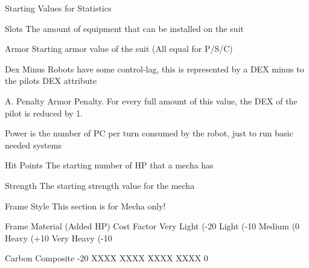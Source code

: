 \documentclass[twoside]{book}
\begin{document}
                    
                  Starting Values for Statistics  
                  
                  
                  
                     Slots 
                      The amount of equipment that can be installed
                     on the suit 
                    
                  
                     Armor 
                      Starting armor value of the suit (All equal
                     for P/S/C) 
                    
                  
                     Dex Minus 
                      Robots have some control-lag, this is
                     represented by a DEX minus to the pilots DEX
                     attribute 
                    
                  
                     A. Penalty 
                      Armor Penalty. For every full amount of this
                     value, the DEX of the pilot is reduced by 1. 
                    
                  
                     Power 
                      is the number of PC per turn consumed by the
                     robot, just to run basic needed systems 
                    
                  
                     Hit Points 
                      The starting number of HP that a mecha has
                     
                    
                  
                     Strength 
                      The starting strength value for the mecha
                     
                    
                  
                
                
                Frame Style  
                 This section is for Mecha only!   
                  
                    
                      
                       Frame Material (Added HP)   
                       Cost Factor   
                       Very Light (-20%
                       Light (-10%
                       Medium (0%
                       Heavy (+10%
                       Very Heavy (-10%
                      
                      
                       Carbon Composite   
                       -20%
                       XXXX   
                       XXXX   
                       XXXX   
                       XXXX   
                       0   
                      
\end{document}
